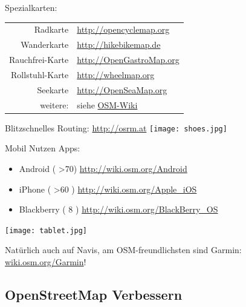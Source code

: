 \documentclass{beamer}
\begin{document}
\begin{frame}{Spezialkarten:}


  \begin{table}[htbp]
    \centering
    \begin{tabular}{r|l}
      Radkarte  &  \url{http://opencyclemap.org} \\
      Wanderkarte & \url{http://hikebikemap.de} \\
      Rauchfrei-Karte & \url{http://OpenGastroMap.org} \\
      Rollstuhl-Karte & \url{http://wheelmap.org} \\
      Seekarte & \url{http://OpenSeaMap.org} \\
\pause
      200 weitere: & siehe \href{http://wiki.openstreetmap.org/wiki/List\_of\_OSM\_based\_Services}{OSM-Wiki} \\
    \end{tabular}
  \end{table}

  Blitzschnelles Routing: \url{http://osrm.at} \hspace{1cm} \texttt{[image: shoes.jpg]}

\end{frame}

\begin{frame}{Mobil Nutzen}
	Apps:
 
 \begin{itemize}
   \item  Android ( \textgreater 70) \url{http://wiki.osm.org/Android}
   \item  iPhone ( \textgreater 60 )  \url{http://wiki.osm.org/Apple\_iOS}
   \item  Blackberry ( 8 ) \url{http://wiki.osm.org/BlackBerry\_OS}
 \end{itemize}
 
 \begin{center}
 \texttt{[image: tablet.jpg]}
 \end{center}

 Natürlich auch auf Navis, am OSM-freundlichsten sind Garmin: \href{http://wiki.osm.org/Garmin}{wiki.osm.org/Garmin}!

\end{frame}

  \subsection{ OpenStreetMap Verbessern}
\end{document}
